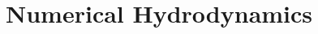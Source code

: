 \documentclass[MScProj_TLRH_ClusterEnergy.tex]{subfiles}
\begin{document}
% 
% 
% 
% 
% 
% 
% 


\section{Numerical Hydrodynamics}
\label{sec:methods-hydro}
\end{document}
